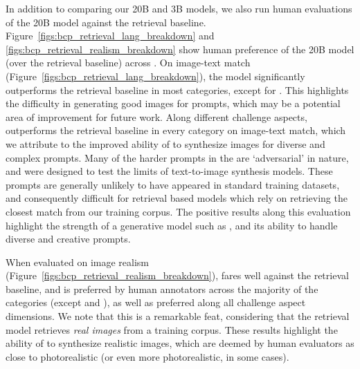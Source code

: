 In addition to comparing our 20B and 3B models, we also run human evaluations of the \bdraw 20B model against the retrieval baseline. Figure~\ref{figs:bcp_retrieval_lang_breakdown} and \ref{figs:bcp_retrieval_realism_breakdown} show human preference of the 20B model (over the retrieval baseline) across \bcpa{}.
On image-text match (Figure~\ref{figs:bcp_retrieval_lang_breakdown}), the \bdraw model significantly outperforms the retrieval baseline in most categories, except for . This highlights the difficulty in generating good images for  prompts, which may be a potential area of improvement for future work. Along different challenge aspects, \bdraw outperforms the retrieval baseline in every category on image-text match, which we attribute to the improved ability of \bdraw to synthesize images for diverse and complex prompts. Many of the harder prompts in the \bcpa{} are  `adversarial' in nature, and were designed to test the limits of text-to-image synthesis models. These prompts are generally unlikely to have appeared in standard training datasets, and consequently difficult for retrieval based models which rely on retrieving the closest match from our training corpus. The positive results along this evaluation highlight the strength of a generative model such as \bdraw, and its ability to handle diverse and creative prompts.

When evaluated on image realism (Figure~\ref{figs:bcp_retrieval_realism_breakdown}), \bdraw fares well against the retrieval baseline, and is preferred by human annotators across the majority of the \bcpa{} categories (except  and ), as well as preferred along all challenge aspect dimensions. We note that this is a remarkable feat, considering that the retrieval model retrieves \textit{real images} from a training corpus. These results highlight the ability of \bdraw to synthesize realistic images, which are deemed by human evaluators as close to photorealistic (or even more photorealistic, in some cases).